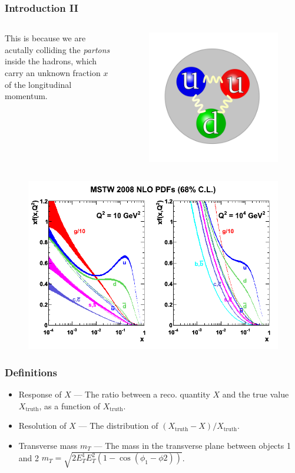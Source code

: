 \documentclass[9pt, lualatex]{beamer}
\begin{document}
\begin{frame}
    \frametitle{Introduction II}

    \begin{columns}
            This is because we are acutally colliding the \emph{partons} inside the hadrons, which carry an unknown
            fraction $x$ of the longitudinal momentum.
        \begin{figure}
            \centering
            \includegraphics[width=.5\textwidth]{proton.png}
        \end{figure}
    \end{columns}

    \begin{figure}
        \centering
        \includegraphics[width=.7\textwidth]{pdf.png}
    \end{figure}

\end{frame}

\begin{frame}
    \frametitle{Definitions}
    \begin{itemize}
        \item Response of $X$ --- The ratio between a reco. quantity $X$ and the true value $X_\text{truth}$, as a function of $X_\text{truth}$.
        \item Resolution of $X$ --- The distribution of $(X_\text{truth} - X)/X_\text{truth}$.
        \item Transverse mass $m_T$ --- The mass in the transverse plane between objects 1 and 2 $m_T = \sqrt{2E_T^1E_T^2(1 - \cos(\phi_1 - \phi2))}$.
    \end{itemize}
\end{frame}
\end{document}
